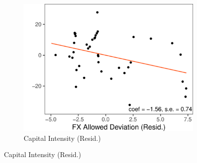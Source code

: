 \documentclass[12pt,letter]{article}
\theoremstyle{break} \theorembodyfont{\normalfont\itshape}
\theoremstyle{break}
\theoremstyle{break} \theorembodyfont{\normalfont\itshape}
\theoremstyle{break} \theorembodyfont{\normalfont\itshape}
\begin{document}
\begin{figure}
\begin{minipage}{\linewidth}
\begin{subfigure}{.33\textwidth}
    \end{subfigure}
    \begin{subfigure}{.33\textwidth}
      \centering
      \caption{Capital Intensity (Resid.)}
      \includegraphics[width=\textwidth]{./Figures/Figure_KY_ERA.pdf}
    \end{subfigure}


\end{minipage}
\end{figure}
\end{document}
